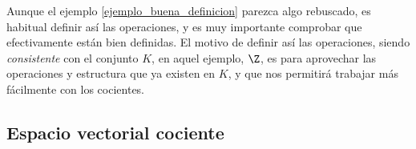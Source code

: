 \documentclass[../algebra_lineal.tex]{subfiles}
\begin{document}
Aunque el ejemplo \ref{ejemplo_buena_definicion} parezca algo rebuscado, es habitual definir así las operaciones, y es muy importante comprobar que efectivamente están bien definidas. El motivo de definir así las operaciones, siendo \textit{consistente} con el conjunto $K$, en aquel ejemplo, $\Z$, es para aprovechar las operaciones y estructura que ya existen en $K$, y que nos permitirá trabajar más fácilmente con los cocientes.

\subsection{Espacio vectorial cociente}
\end{document}
